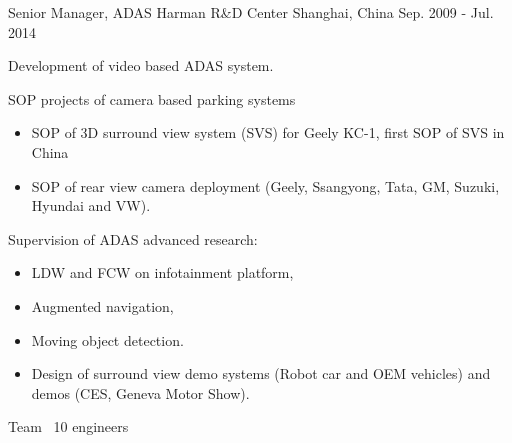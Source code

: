 \documentclass[../cv.tex]{subfiles}
\begin{document}
\begin{cventries}
	\cventry
	{Senior Manager, ADAS} %
	{Harman R\&D Center} %
	{Shanghai, China} %
	{Sep. 2009 - Jul. 2014} %
	{
		\begin{cvitems}
			\item Development of video based ADAS system.
			\item SOP projects of camera based parking systems
			\begin{itemize}
				\item SOP of 3D surround view system (SVS) for Geely KC-1, first SOP of SVS in China
				\item SOP of rear view camera deployment (Geely, Ssangyong, Tata, GM, Suzuki, Hyundai and VW).
			\end{itemize}
			\item Supervision of ADAS advanced research:
			\begin{itemize}
				\item LDW and FCW on infotainment platform,
				\item Augmented navigation,
				\item Moving object detection.
				\item Design of surround view demo systems (Robot car and OEM vehicles) and demos (CES, Geneva Motor Show).
			\end{itemize}
			\item Team ~10 engineers
		\end{cvitems}
	}
\end{cventries}
\end{document}
